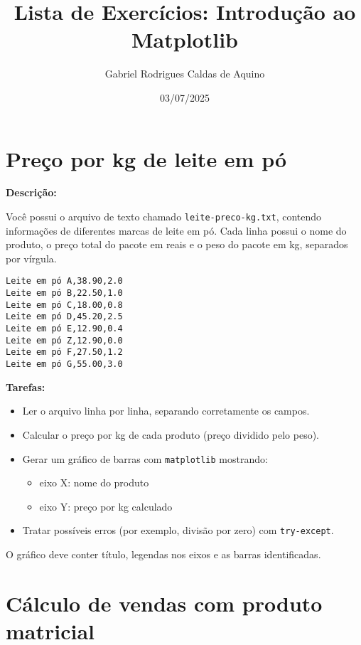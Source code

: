 \title{Lista de Exercícios: Introdução ao Matplotlib}
\author{Gabriel Rodrigues Caldas de Aquino}
\date{03/07/2025}



\maketitle

\section{Preço por kg de leite em pó}

\textbf{Descrição:}  

Você possui o arquivo de texto chamado \texttt{leite-preco-kg.txt}, contendo informações de diferentes marcas de leite em pó. Cada linha possui o nome do produto, o preço total do pacote em reais e o peso do pacote em kg, separados por vírgula.  

\begin{verbatim}
Leite em pó A,38.90,2.0
Leite em pó B,22.50,1.0
Leite em pó C,18.00,0.8
Leite em pó D,45.20,2.5
Leite em pó E,12.90,0.4
Leite em pó Z,12.90,0.0
Leite em pó F,27.50,1.2
Leite em pó G,55.00,3.0
\end{verbatim}

\textbf{Tarefas:}

\begin{itemize}
  \item Ler o arquivo linha por linha, separando corretamente os campos.
  \item Calcular o preço por kg de cada produto (preço dividido pelo peso).
  \item Gerar um gráfico de barras com \texttt{matplotlib} mostrando:
    \begin{itemize}
      \item eixo X: nome do produto
      \item eixo Y: preço por kg calculado
    \end{itemize}
  \item Tratar possíveis erros (por exemplo, divisão por zero) com \texttt{try-except}.
\end{itemize}

O gráfico deve conter título, legendas nos eixos e as barras identificadas.


\section{Cálculo de vendas com produto matricial}

